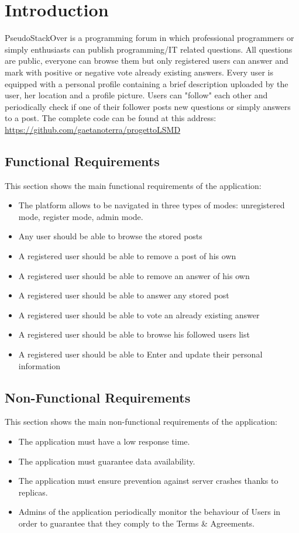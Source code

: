 \documentclass[11pt]{report}
\begin{document}
\newpage

\chapter{Introduction}\label{introduction}
PseudoStackOver is a programming forum in which professional  programmers or simply enthusiasts can publish programming/IT related questions. All questions are public, everyone can browse them but only registered users can answer and mark with positive or negative vote already existing answers. Every user is equipped with a personal profile containing a brief description uploaded by the user, her location and a profile picture. Users can "follow" each other and periodically check if one of their follower posts new questions or simply answers to a post.
The complete code can be found at this address:
\url{https://github.com/gaetanoterra/progettoLSMD}

\section{Functional Requirements}
This section  shows the main functional requirements of the application:
\begin{itemize}
  \item The platform allows to be navigated in three types of modes: unregistered mode, register mode, admin mode.
  \item Any user should be able to browse the stored posts
  \item A registered user should be able to remove a post of his own
  \item A registered user should be able to remove an answer of his own
  \item A registered user should be able to answer any stored post
  \item A registered user should be able to vote an already existing answer
  \item A registered user should be able to browse his followed users list
  \item A registered user should be able to Enter and update their personal information
  
\end{itemize}
\newpage
\section{Non-Functional Requirements}
This section shows the main non-functional requirements of the application:
\begin{itemize}
  \item The application must have a low response time.
  \item The application must guarantee data availability.
  \item The application must ensure prevention against server crashes thanks to replicas.
  \item Admins of the application periodically monitor the behaviour of Users in order to guarantee that they comply to the Terms \& Agreements.
  
\end{itemize}
\end{document}
